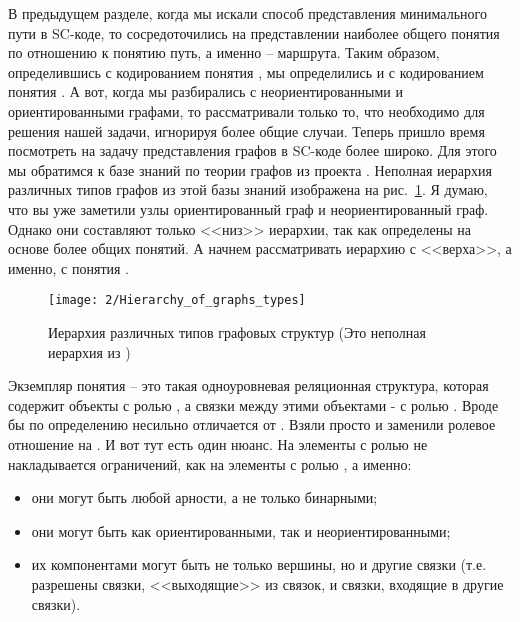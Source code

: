 В предыдущем разделе, когда мы искали способ представления
минимального пути в SC-коде, то сосредоточились на представлении
наиболее общего понятия по отношению к понятию путь, а именно –
маршрута. Таким образом, определившись с кодированием понятия
, мы определились и с кодированием понятия
. А вот, когда мы разбирались с неориентированными и
ориентированными графами, то рассматривали только то, что необходимо
для решения нашей задачи, игнорируя более общие случаи. Теперь пришло
время посмотреть на задачу представления графов в SC-коде более
широко. Для этого мы обратимся к базе знаний по теории графов из
проекта \ostisgtlink. Неполная иерархия различных типов графов из этой
базы знаний изображена на рис.~\ref{fig:Hierarchy_of_graphs_types}. Я
думаю, что вы уже заметили узлы ориентированный граф и
неориентированный граф. Однако они составляют только <<низ>> иерархии,
так как определены на основе более общих понятий. А начнем
рассматривать иерархию с <<верха>>, а именно, с понятия .

\begin{figure}[h!]
  \centering
  \texttt{[image: 2/Hierarchy\_of\_graphs\_types]}
  \caption{Иерархия различных типов графовых структур (Это неполная
    иерархия из \ostisgtlink)}
  \label{fig:Hierarchy_of_graphs_types}
\end{figure}

Экземпляр понятия  – это такая одноуровневая
реляционная структура, которая содержит объекты с ролью
, а связки между этими объектами - с ролью
. Вроде бы по определению 
несильно отличается от . Взяли просто и
заменили ролевое отношение  на . И вот тут
есть один нюанс. На элементы с ролью   не накладывается ограничений, как на элементы с ролью
 , а именно:

\begin{itemize}
\item они могут быть любой арности, а не только бинарными;
\item они могут быть как ориентированными, так и неориентированными;
\item их компонентами могут быть не только вершины, но и другие связки
  (т.е. разрешены связки, <<выходящие>> из связок, и связки, входящие
  в другие связки).
\end{itemize}

